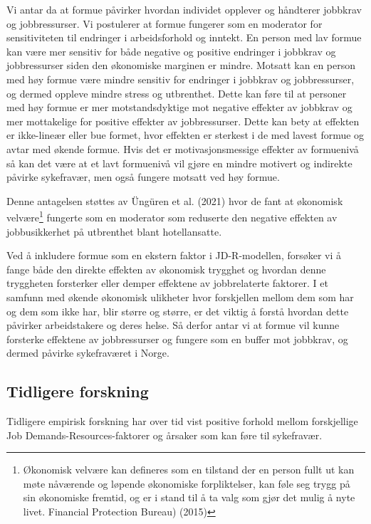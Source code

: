 \documentclass[
  12pt,
  a4paper,
  DIV=11,
  numbers=noendperiod]{scrartcl}
\begin{document}
Vi antar da at formue påvirker hvordan individet opplever og håndterer
jobbkrav og jobbressurser. Vi postulerer at formue fungerer som en
moderator for sensitiviteten til endringer i arbeidsforhold og inntekt.
En person med lav formue kan være mer sensitiv for både negative og
positive endringer i jobbkrav og jobbressurser siden den økonomiske
marginen er mindre. Motsatt kan en person med høy formue være mindre
sensitiv for endringer i jobbkrav og jobbressurser, og dermed oppleve
mindre stress og utbrenthet. Dette kan føre til at personer med høy
formue er mer motstandsdyktige mot negative effekter av jobbkrav og mer
mottakelige for positive effekter av jobbressurser. Dette kan bety at
effekten er ikke-lineær eller bue formet, hvor effekten er sterkest i de
med lavest formue og avtar med økende formue. Hvis det er
motivasjonsmessige effekter av formuenivå så kan det være at et lavt
formuenivå vil gjøre en mindre motivert og indirekte påvirke sykefravær,
men også fungere motsatt ved høy formue.

Denne antagelsen støttes av Üngüren et al. (2021) hvor de fant at
økonomisk velvære\footnote{Økonomisk velvære kan defineres som en
  tilstand der en person fullt ut kan møte nåværende og løpende
  økonomiske forpliktelser, kan føle seg trygg på sin økonomiske
  fremtid, og er i stand til å ta valg som gjør det mulig å nyte livet.
  Financial Protection Bureau) (2015)} fungerte som en moderator som
reduserte den negative effekten av jobbusikkerhet på utbrenthet blant
hotellansatte.

Ved å inkludere formue som en ekstern faktor i JD-R-modellen, forsøker
vi å fange både den direkte effekten av økonomisk trygghet og hvordan
denne tryggheten forsterker eller demper effektene av jobbrelaterte
faktorer. I et samfunn med økende økonomisk ulikheter hvor forskjellen
mellom dem som har og dem som ikke har, blir større og større, er det
viktig å forstå hvordan dette påvirker arbeidstakere og deres helse. Så
derfor antar vi at formue vil kunne forsterke effektene av jobbressurser
og fungere som en buffer mot jobbkrav, og dermed påvirke sykefraværet i
Norge.

\subsection{Tidligere forskning}\label{tidligere-forskning}

Tidligere empirisk forskning har over tid vist positive forhold mellom
forskjellige Job Demands-Resources-faktorer og årsaker som kan føre til
sykefravær.
\end{document}
